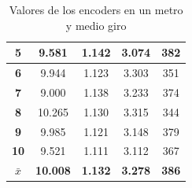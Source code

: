 \begin{table}[H]
\begin{tabular}{@{}ccccc@{}}
\multicolumn{1}{|c|}{\textbf{5}}  & \multicolumn{1}{c|}{9.581}                                                   & \multicolumn{1}{c|}{1.142}                                                     & \multicolumn{1}{c|}{3.074}                                                       & \multicolumn{1}{c|}{382}                                                           \\ \midrule
\multicolumn{1}{|c|}{\textbf{6}}  & \multicolumn{1}{c|}{9.944}                                                   & \multicolumn{1}{c|}{1.123}                                                     & \multicolumn{1}{c|}{3.303}                                                       & \multicolumn{1}{c|}{351}                                                           \\ \midrule
\multicolumn{1}{|c|}{\textbf{7}}  & \multicolumn{1}{c|}{9.000}                                                   & \multicolumn{1}{c|}{1.138}                                                     & \multicolumn{1}{c|}{3.233}                                                       & \multicolumn{1}{c|}{374}                                                           \\ \midrule
\multicolumn{1}{|c|}{\textbf{8}}  & \multicolumn{1}{c|}{10.265}                                                  & \multicolumn{1}{c|}{1.130}                                                     & \multicolumn{1}{c|}{3.315}                                                       & \multicolumn{1}{c|}{344}                                                           \\ \midrule
\multicolumn{1}{|c|}{\textbf{9}}  & \multicolumn{1}{c|}{9.985}                                                   & \multicolumn{1}{c|}{1.121}                                                     & \multicolumn{1}{c|}{3.148}                                                       & \multicolumn{1}{c|}{379}                                                           \\ \midrule
\multicolumn{1}{|c|}{\textbf{10}} & \multicolumn{1}{c|}{9.521}                                                   & \multicolumn{1}{c|}{1.111}                                                     & \multicolumn{1}{c|}{3.112}                                                       & \multicolumn{1}{c|}{367}                                                           \\ \midrule
\textbf{$\bar{x}$} & \textbf{10.008}                                                              & \textbf{1.132}                                                                 & \textbf{3.278}                                                                   & \textbf{386}                                                                       \\ \bottomrule
\end{tabular}
\caption{Valores de los encoders en un metro y medio giro}
\label{tab:encoders_data}
\end{table}

